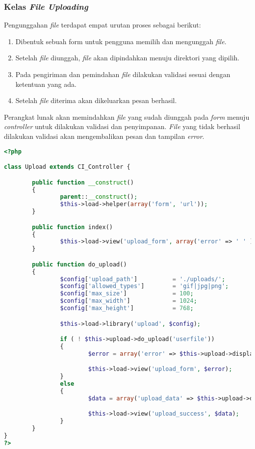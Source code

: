 \subsubsection{Kelas \textit{File Uploading}}
Pengunggahan \textit{file} terdapat empat urutan proses sebagai berikut:
\begin{enumerate}
\item Dibentuk sebuah form untuk pengguna memilih dan mengunggah \textit{file}.
\item Setelah \textit{file} diunggah, \textit{file} akan dipindahkan menuju direktori yang dipilih.
\item Pada pengiriman dan pemindahan \textit{file} dilakukan validasi sesuai dengan ketentuan yang ada.
\item Setelah \textit{file} diterima akan dikeluarkan pesan berhasil.
\end{enumerate}

Perangkat lunak akan memindahkan \textit{file} yang sudah diunggah pada \textit{form} menuju \textit{controller} untuk dilakukan validasi dan penyimpanan. \textit{File} yang tidak berhasil dilakukan validasi akan mengembalikan pesan dan tampilan \textit{error}.

\begin{lstlisting}[language=PHP, caption=Contoh \textit{controller} untuk melakukan validasi dan penyimpanan, label=kode:controllerfileupload]
<?php

class Upload extends CI_Controller {

        public function __construct()
        {
                parent::__construct();
                $this->load->helper(array('form', 'url'));
        }

        public function index()
        {
                $this->load->view('upload_form', array('error' => ' ' ));
        }

        public function do_upload()
        {
                $config['upload_path']          = './uploads/';
                $config['allowed_types']        = 'gif|jpg|png';
                $config['max_size']             = 100;
                $config['max_width']            = 1024;
                $config['max_height']           = 768;

                $this->load->library('upload', $config);

                if ( ! $this->upload->do_upload('userfile'))
                {
                        $error = array('error' => $this->upload->display_errors());

                        $this->load->view('upload_form', $error);
                }
                else
                {
                        $data = array('upload_data' => $this->upload->data());

                        $this->load->view('upload_success', $data);
                }
        }
}
?>
\end{lstlisting}

